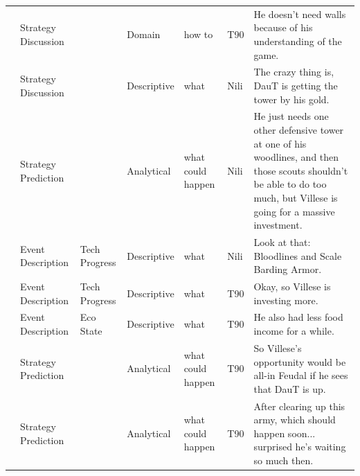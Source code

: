 {\begin{longtable}{@{}>{\theAppRow}r|L{2.3cm}L{2.2cm}L{1.4cm}L{2.2cm}L{0.5cm}U{5.6cm}@{}}
    & Strategy Discussion   &                      & Domain      & how to            & T90     & He doesn't need walls because of his understanding of the game.                                                                                                                                                          \\
    & Strategy Discussion   &                      & Descriptive   & what              & Nili    & The crazy thing is, DauT is getting the tower by his gold.                                                                                                                                                               \\
    & Strategy Prediction   &                      & Analytical  & what could happen & Nili    & He just needs one other defensive tower at one of his woodlines, and then those scouts shouldn't be able to do too much, but Villese is going for a massive investment.                                                  \\
    & Event Description     & Tech Progress          & Descriptive   & what              & Nili    & Look at that: Bloodlines and Scale Barding Armor.                                                                                                                                                                        \\
    & Event Description     & Tech Progress           & Descriptive   & what              & T90     & Okay, so Villese is investing more.                                                                                                                                                                                      \\
    & Event Description     & Eco State            & Descriptive   & what              & T90     & He also had less food income for a while.                                                                                                                                                                                \\
    & Strategy Prediction   &                      & Analytical  & what could happen & T90     & So Villese's opportunity would be all-in Feudal if he sees that DauT is up.                                                                                                                                              \\
    & Strategy Prediction   &                      & Analytical  & what could happen & T90     & After clearing up this army, which should happen soon... surprised he's waiting so much then.                                                                                                                            \\

\end{longtable}}
